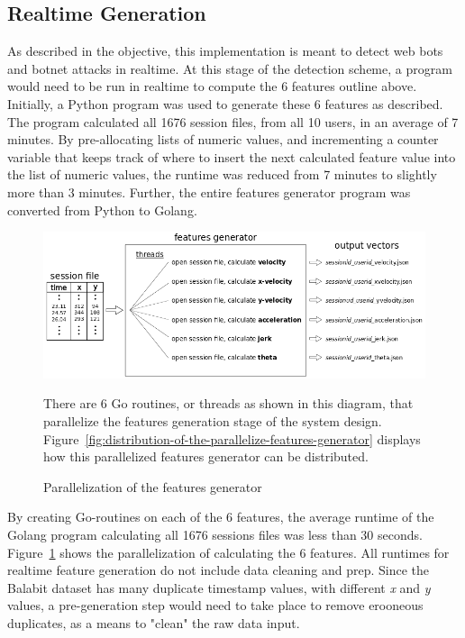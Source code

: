 \subsection{Realtime Generation}\label{subsec:realtime-generation}
As described in the objective, this implementation is meant to detect web bots and botnet attacks in realtime.
At this stage of the detection scheme, a program would need to be run in realtime to compute the 6 features outline above.
Initially, a Python program was used to generate these 6 features as described.
The program calculated all 1676 session files, from all 10 users, in an average of 7 minutes.
By pre-allocating lists of numeric values, and incrementing a counter variable that keeps track of where to insert the next calculated feature value into the list of numeric values, the runtime was reduced from 7 minutes to slightly more than 3 minutes.
Further, the entire features generator program was converted from Python to Golang.

\begin{figure}[!h]
    \includegraphics[width=1\columnwidth]{figures/parallelized_features_generator}
    \caption{Parallelization of the features generator}
    \label{fig:parallelization-of-the-features-generator-implementation-version}
    {\small There are 6 Go routines, or threads as shown in this diagram, that parallelize the features generation stage of the system design. Figure~\ref{fig:distribution-of-the-parallelize-features-generator} displays how this parallelized features generator can be distributed.}
\end{figure}

By creating Go-routines on each of the 6 features, the average runtime of the Golang program calculating all 1676 sessions files was less than 30 seconds.
Figure~\ref{fig:parallelization-of-the-features-generator-implementation-version} shows the parallelization of calculating the 6 features.
All runtimes for realtime feature generation do not include data cleaning and prep.
Since the Balabit dataset has many duplicate timestamp values, with different \textit{x} and \textit{y} values, a pre-generation step would need to take place to remove erooneous duplicates, as a means to "clean" the raw data input.

